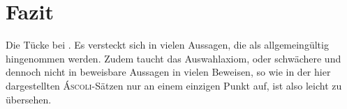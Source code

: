 \chapter{Fazit}

Die Tücke bei \AC. Es versteckt sich in vielen Aussagen, die als allgemeingültig hingenommen werden. Zudem taucht das Auswahlaxiom, oder schwächere und dennoch nicht in \ZF beweisbare Aussagen in vielen Beweisen, so wie in der hier dargestellten \textsc{Áscoli}-Sätzen nur an einem einzigen Punkt auf, ist also leicht zu übersehen.
